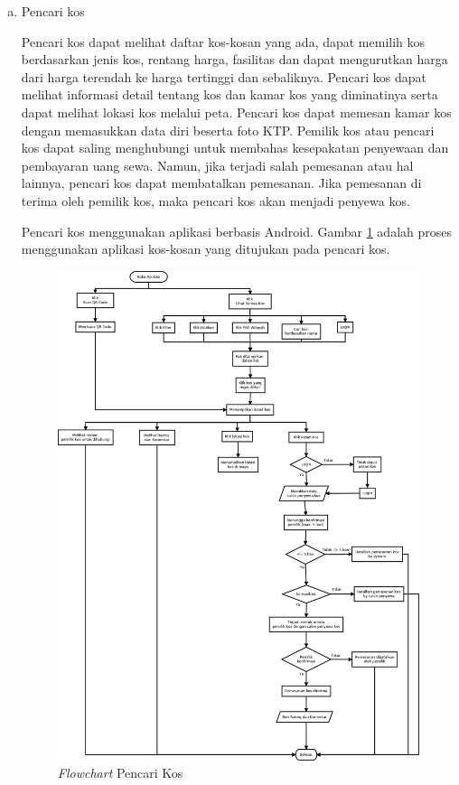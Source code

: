 \begin{enumerate}[a.]
			\item Pencari kos
			
			Pencari kos dapat melihat daftar kos-kosan yang ada, dapat memilih kos berdasarkan jenis kos, rentang harga, fasilitas dan dapat mengurutkan harga dari harga terendah ke harga tertinggi dan sebaliknya. Pencari kos dapat melihat informasi detail tentang kos dan kamar kos yang diminatinya serta dapat melihat lokasi kos melalui peta. Pencari kos dapat memesan kamar kos dengan memasukkan data diri beserta foto KTP. Pemilik kos atau pencari kos dapat saling menghubungi untuk membahas kesepakatan penyewaan dan pembayaran uang sewa. Namun, jika terjadi salah pemesanan atau hal lainnya, pencari kos dapat membatalkan pemesanan. Jika pemesanan di terima oleh pemilik kos, maka pencari kos akan menjadi penyewa kos. 
			
			Pencari kos menggunakan aplikasi berbasis Android. Gambar \ref{flow2} adalah proses menggunakan aplikasi kos-kosan yang ditujukan pada pencari kos.
			 
			\begin{figure}[H]
				\centering
				\includegraphics[width=\textwidth]{gambar/ocl/diagramuser}
				\caption{\textit{Flowchart} Pencari Kos}
				\label{flow2}
			\end{figure}
		

\end{enumerate}
